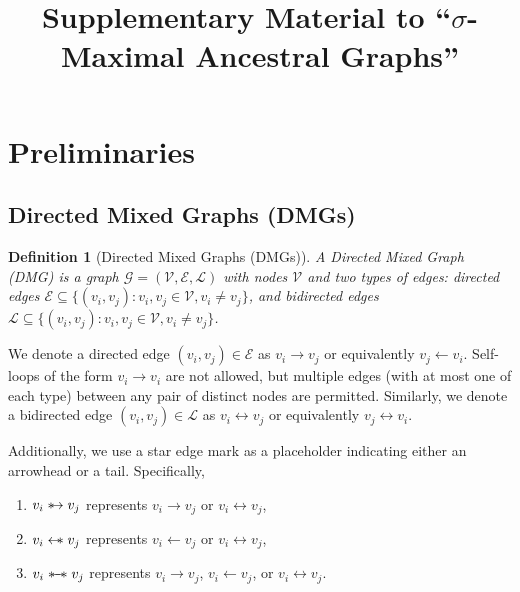 \documentclass[accepted]{uai2025} %
\newtheorem{definition}{Definition}
\newcommand{\tuh}{\mathrel{\rightarrow}}
\newcommand{\hut}{\mathrel{\leftarrow}}
\newcommand{\huh}{\mathrel{\leftrightarrow}}
\newcommand{\hus}{\mathrel{{\leftarrow\mkern-11mu\ast}}}
\newcommand{\suh}{\mathrel{{\ast\mkern-11mu\to}}}
\newcommand{\sus}{\mathrel{{\ast\mkern-11mu\relbar\mkern-9mu\relbar\mkern-11mu\ast}}}
\begin{document}


\newpage

\onecolumn

\title{Supplementary Material to ``$\sigma$-Maximal Ancestral Graphs''}
\maketitle



\appendix






\section{Preliminaries}
\subsection{Directed Mixed Graphs (DMGs)}
\begin{definition} [Directed Mixed Graphs (DMGs)]
A \emph{Directed Mixed Graph (DMG)} is a graph $\mathcal{G}=({\mathcal{V}},\mathcal{E},\mathcal{L})$ with nodes ${\mathcal{V}}$ and two types of edges: \emph{directed edges} $\mathcal{E}\subseteq \{(v_i,v_j):v_i,v_j\in{\mathcal{V}},v_i\neq v_j\}$, and bidirected edges $\mathcal{L}\subseteq\{(v_i,v_j):v_i,v_j\in{\mathcal{V}},v_i\neq v_j\}$.
\end{definition}

We denote a directed edge \( (v_i, v_j) \in \mathcal{E} \) as \( v_i \rightarrow v_j \) or equivalently \( v_j \leftarrow v_i \). Self-loops of the form \( v_i \rightarrow v_i \) are not allowed, but multiple edges (with at most one of each type) between any pair of distinct nodes are permitted. Similarly, we denote a bidirected edge \( (v_i, v_j) \in \mathcal{L} \) as \( v_i \huh  v_j \) or equivalently \( v_j \huh  v_i \).  

Additionally, we use a star edge mark as a placeholder indicating either an arrowhead or a tail. Specifically,
\begin{enumerate}
\item \( v_i \suh v_j \) represents \( v_i \tuh v_j \) or \( v_i \huh  v_j \),
\item \( v_i \hus  v_j \) represents \( v_i \hut v_j \) or \( v_i \huh  v_j \),
\item \( v_i \sus  v_j \) represents \( v_i \tuh v_j \), \( v_i \leftarrow v_j \), or \( v_i \huh  v_j \).  
\end{enumerate}
\end{document}
